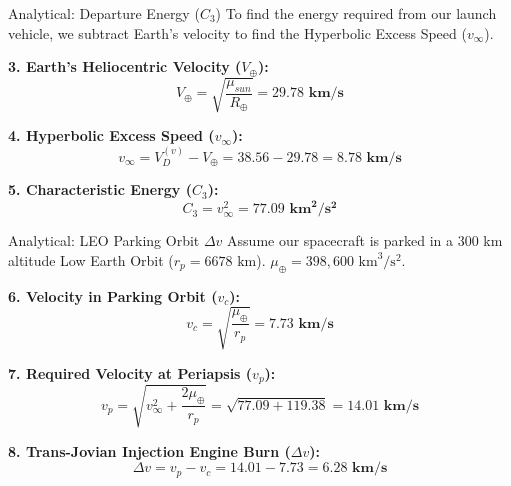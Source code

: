 \documentclass[11pt]{beamer}
\begin{document}
\begin{frame}{Analytical: Departure Energy ($C_3$)}
    To find the energy required from our launch vehicle, we subtract Earth's velocity to find the Hyperbolic Excess Speed ($v_\infty$).
    
    \vspace{0.2cm}
    \textbf{3. Earth's Heliocentric Velocity ($V_{\oplus}$):}
    \begin{equation}
        V_{\oplus} = \sqrt{\frac{\mu_{sun}}{R_{\oplus}}} = \mathbf{29.78 \text{ km/s}}
    \end{equation}
    
    \textbf{4. Hyperbolic Excess Speed ($v_\infty$):}
    \begin{equation}
        v_\infty = V_{D}^{(v)} - V_{\oplus} = 38.56 - 29.78 = \mathbf{8.78 \text{ km/s}}
    \end{equation}
    
    \textbf{5. Characteristic Energy ($C_3$):}
    \begin{equation}
        C_3 = v_\infty^2 = \mathbf{77.09 \text{ km}^2/\text{s}^2}
    \end{equation}
\end{frame}

\begin{frame}{Analytical: LEO Parking Orbit $\Delta v$}
    Assume our spacecraft is parked in a 300 km altitude Low Earth Orbit ($r_{p} = 6678 \text{ km}$). $\mu_{\oplus} = 398,600 \text{ km}^3/\text{s}^2$.
    
    \vspace{0.2cm}
    \textbf{6. Velocity in Parking Orbit ($v_c$):}
    \begin{equation}
        v_c = \sqrt{\frac{\mu_{\oplus}}{r_{p}}} = \mathbf{7.73 \text{ km/s}}
    \end{equation}
    
    \textbf{7. Required Velocity at Periapsis ($v_p$):}
    \begin{equation}
        v_p = \sqrt{v_\infty^2 + \frac{2\mu_{\oplus}}{r_{p}}} = \sqrt{77.09 + 119.38} = \mathbf{14.01 \text{ km/s}}
    \end{equation}
    
    \textbf{8. Trans-Jovian Injection Engine Burn ($\Delta v$):}
    \begin{equation}
        \Delta v = v_p - v_c = 14.01 - 7.73 = \mathbf{6.28 \text{ km/s}}
    \end{equation}
\end{frame}
\end{document}
